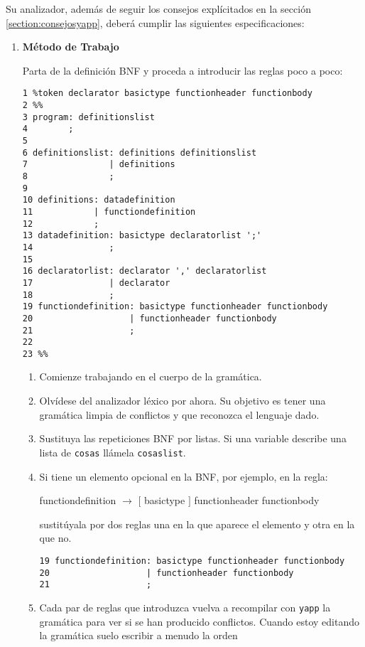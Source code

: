 \vspace{0.25cm}
Su analizador, además de seguir los consejos explícitados en la 
sección \ref{section:consejosyapp},
deberá cumplir las siguientes especificaciones:

\begin{enumerate}
\item {\bf Método de Trabajo}

Parta de la definición BNF y proceda a introducir las reglas poco a poco:
\begin{verbatim}
1 %token declarator basictype functionheader functionbody
2 %%
3 program: definitionslist
4        ;
5
6 definitionslist: definitions definitionslist
7                | definitions
8                ;
9
10 definitions: datadefinition
11            | functiondefinition
12            ;
13 datadefinition: basictype declaratorlist ';'
14               ;
15
16 declaratorlist: declarator ',' declaratorlist
17               | declarator
18               ;
19 functiondefinition: basictype functionheader functionbody
20                   | functionheader functionbody
21                   ;
22
23 %%
\end{verbatim}

\begin{enumerate}
\item
Comienze trabajando en el cuerpo de la gramática.
\item
Olvídese del 
analizador léxico por ahora. Su objetivo es tener una gramática limpia
de conflictos y que reconozca el lenguaje dado. 
\item
Sustituya las repeticiones
BNF por listas. Si una variable describe una lista de \verb|cosas| llámela
\verb|cosaslist|. 
\item
Si tiene un elemento opcional en la BNF, por ejemplo, en la regla: 

functiondefinition $\rightarrow$ $[$ basictype $]$ functionheader functionbody

sustitúyala por dos reglas una en la que aparece el elemento y otra en la 
que no.
\begin{verbatim}
19 functiondefinition: basictype functionheader functionbody
20                   | functionheader functionbody
21                   ;
\end{verbatim}
\item
Cada par de reglas que introduzca vuelva a recompilar con \verb|yapp| la gramática
para ver si se han producido conflictos. Cuando estoy editando la gramática
suelo escribir a menudo la orden 


\end{enumerate}
\end{enumerate}
